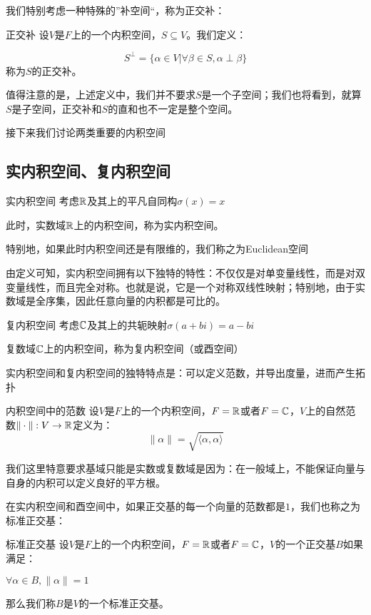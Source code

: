 \documentclass[12pt, a4paper, oneside, UTF8]{ctexbook}
\begin{document}
			我们特别考虑一种特殊的”补空间“，称为正交补：
			\begin{defn}{正交补}{}
				设$V$是$F$上的一个内积空间，$S \subseteq V$。我们定义：

				\begin{equation}
					S^{\perp}=\{\alpha \in V | \forall \beta \in S,\alpha \perp \beta \}
				\end{equation}
				称为$S$的正交补。
			\end{defn}
			值得注意的是，上述定义中，我们并不要求$S$是一个子空间；我们也将看到，就算$S$是子空间，正交补和$S$的直和也不一定是整个空间。

			接下来我们讨论两类重要的内积空间
		\subsection{实内积空间、复内积空间}
			\begin{defn}{实内积空间}{}
				考虑$\mathbb{R}$及其上的平凡自同构$\sigma(x)=x$

				此时，实数域$\mathbb{R}$上的内积空间，称为实内积空间。

				特别地，如果此时内积空间还是有限维的，我们称之为Euclidean空间
			\end{defn}
			由定义可知，实内积空间拥有以下独特的特性：不仅仅是对单变量线性，而是对双变量线性，而且完全对称。也就是说，它是一个对称双线性映射；特别地，由于实数域是全序集，因此任意向量的内积都是可比的。
			\begin{defn}{复内积空间}{}
				考虑$\mathbb{C}$及其上的共轭映射$\sigma(a+bi)=a-bi$

				复数域$\mathbb{C}$上的内积空间，称为复内积空间（或酉空间）
			\end{defn}
			实内积空间和复内积空间的独特特点是：可以定义范数，并导出度量，进而产生拓扑
			\begin{defn}{内积空间中的范数}{}
				设$V$是$F$上的一个内积空间，$F=\mathbb{R}$或者$F=\mathbb{C}$，$V$上的自然范数$\|\cdot \|:V \to \mathbb{R}$定义为：
				\begin{equation}
					\|\alpha \|=\sqrt{\langle \alpha ,\alpha \rangle }
				\end{equation}
			\end{defn}
			我们这里特意要求基域只能是实数或复数域是因为：在一般域上，不能保证向量与自身的内积可以定义良好的平方根。
			
			在实内积空间和酉空间中，如果正交基的每一个向量的范数都是$1$，我们也称之为标准正交基：
			\begin{defn}{标准正交基}{}
				设$V$是$F$上的一个内积空间，$F=\mathbb{R}$或者$F=\mathbb{C}$，$V$的一个正交基$B$如果满足：

				$\forall \alpha \in B,\|\alpha \|=1$

				那么我们称$B$是$V$的一个标准正交基。
			\end{defn}
\end{document}

